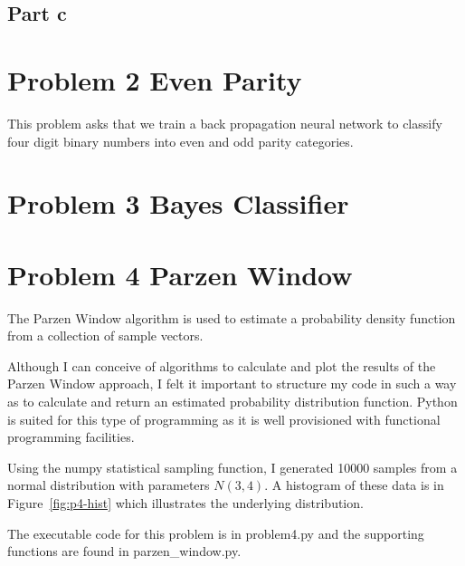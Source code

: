 \documentclass{report}
\begin{document}
\subsection*{Part c}

\section*{Problem 2 Even Parity}
This problem asks that we train a back propagation neural
network to classify four digit binary numbers into even and odd
parity categories.


\section*{Problem 3 Bayes Classifier}

\section*{Problem 4 Parzen Window}
The Parzen Window algorithm is used to estimate a probability density
function from a collection of sample vectors.

Although I can conceive of algorithms to calculate and plot the
results of the Parzen Window approach, I felt it important to
structure my code in such a way as to calculate and return an
estimated probability distribution function.  Python is suited for
this type of programming as it is well provisioned with functional
programming facilities.

Using the numpy statistical sampling function, I generated 10000
samples from a normal distribution with parameters $N(3,4)$.  A
histogram of these data is in Figure~\ref{fig:p4-hist} which illustrates
the underlying distribution.

The executable code for this problem is in problem4.py and the
supporting functions are found in parzen\_window.py.
\end{document}
